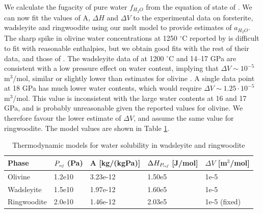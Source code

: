 \documentclass[review]{elsarticle}
\begin{document}
We calculate the fugacity of pure water $f_{H_2O}$ from the equation of state of \citep{PS1995}. We can now fit the values of A, $\Delta H$ and $\Delta V$ to the experimental data on forsterite, wadsleyite and ringwoodite using our melt model to provide estimates of $a_{H_2O}$. The sharp spike in olivine water concentrations at 1250 $^{\circ}$C reported by \cite{SFNHB2006} is difficult to fit with reasonable enthalpies, but we obtain good fits with the rest of their data, and those of \cite{LSKO2009}. The wadsleyite data of \cite{DDFK2005} at 1200 $^{\circ}$C and 14--17 GPa are consistent with a low pressure effect on water content, implying that $\Delta V \sim 10^{-5}$ m$^3$/mol, similar or slightly lower than estimates for olivine \citep[1.00 -- 1.06 $\cdot 10^{-5}$ m$^3$/mol][]{KKR1996, ZGK2004, MDAR2006}. A single data point at 18 GPa has much lower water contents, which would require $\Delta V \sim 1.25 \cdot 10^{-5}$ m$^3$/mol. This value is inconsistent with the large water contents at 16 and 17 GPa, and is probably unreasonable given the reported values for olivine. We therefore favour the lower estimate of $\Delta V$, and assume the same value for ringwoodite. The model values are shown in Table \ref{table:partitioning}.

\begin{table}[]
\centering
\caption{Thermodynamic models for water solubility in wadsleyite and ringwoodite}
\label{table:partitioning}
\begin{tabular}{lllll}
Phase & $P_{\textit{\tiny{ref}}}$ (Pa) & A [kg/(kgPa)] & $\Delta H_{P_{\textit{\tiny{ref}}}}$ [J/mol] & $\Delta V$ [m$^3$/mol] \\
\hline
Olivine & 1.2e10 & 3.23e-12 & 1.50e5 & 1e-5 \\
Wadsleyite & 1.5e10 & 1.97e-12 & 1.60e5 & 1e-5 \\
Ringwoodite & 2.0e10 & 1.46e-12 & 2.03e5 & 1e-5 (fixed)
\end{tabular}
\end{table}
\end{document}
